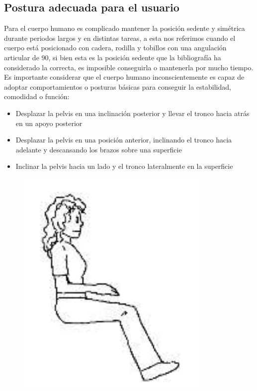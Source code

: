 \subsection{Postura adecuada para el usuario}

Para el cuerpo humano es complicado mantener la posici\'on sedente y sim\'etrica
durante periodos largos y en distintas tareas, a esta nos referimos cuando el
cuerpo est\'a posicionado con cadera, rodilla y tobillos con una angulaci\'on
articular de 90\textdegree, si bien esta es la posici\'on sedente que la
bibliograf\'ia ha considerado la correcta, es imposible conseguirla o mantenerla
por mucho tiempo. Es importante considerar que el cuerpo humano
inconscientemente es capaz de adoptar comportamientos o posturas b\'asicas para
conseguir la estabilidad, comodidad o funci\'on:
\begin{itemize}
    \item Desplazar la pelvis en una inclinaci\'on posterior y llevar el tronco
        hacia atr\'as en un apoyo posterior
    \item Desplazar la pelvis en una posici\'on anterior, inclinando el tronco
        hacia adelante y descansando los brazos sobre una superficie
    \item Inclinar la pelvis hacia un lado y el tronco lateralmente en la
        superficie
\end{itemize}
\begin{figure}
\centering
\begin{minipage}{.5\textwidth}
  \centering
  \includegraphics[width=.4\linewidth]{Figures/poosition.png}
  \label{fig:position}
\end{minipage}%
\end{figure}

